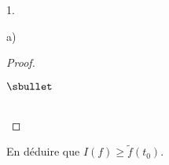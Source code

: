 \documentclass[11pt]{article}%
\begin{document}
\begin{noliste}{1.}
\begin{noliste}{a)}
\begin{proof}
\begin{noliste}{$\sbullet$}
%       
%       
%       
%       
%       
     \end{noliste}
    
    
    
    
    
    
    
    
    ~\\[-1.4cm]
  \end{proof}
  
  \item En déduire que $I(f) \geq \tilde{f}(t_0)$. 
  

\end{noliste}
\end{noliste}
\end{document}
